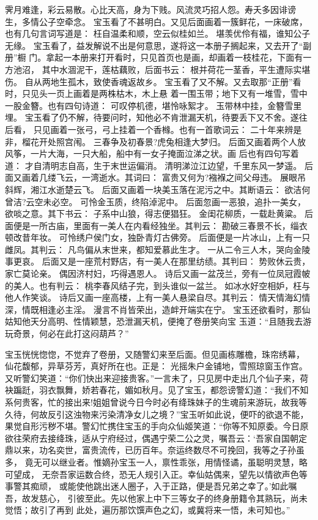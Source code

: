 霁月难逢，彩云易散。心比天高，身为下贱。风流灵巧招人怨。寿夭多因诽谤
生，多情公子空牵念。
宝玉看了不甚明白。又见后面画着一簇鲜花，一床破席，也有几句言词写道是：
枉自温柔和顺，空云似桂如兰。
堪羡优伶有福，谁知公子无缘。
宝玉看了，益发解说不出是何意思，遂将这一本册子搁起来，又去开了“副册”橱
门。拿起一本册来打开看时，只见首页也是画，却画着一枝桂花，下面有一方池沼，
其中水涸泥干，莲枯藕败，后面书云：
根并荷花一茎香，平生遭际实堪伤。
自从两地生孤木，致使香魂返故乡。
宝玉看了又不解。又去取那“正册”看时，只见头一页上画着是两株枯木，木上悬
着一围玉带；地下又有一堆雪，雪中一股金簪。也有四句诗道：
可叹停机德，堪怜咏絮才。
玉带林中挂，金簪雪里埋。
宝玉看了仍不解，待要问时，知他必不肯泄漏天机，待要丢下又不舍。遂往后看，
只见画着一张弓，弓上挂着一个香橼。也有一首歌词云：
二十年来辨是非，榴花开处照宫闱。
三春争及初春景?虎兔相逢大梦归。
后面又画着两个人放风筝，一片大海，一只大船，船中有一女子掩面泣涕之状。画
后也有四句写着道：
才自清明志自高，生于末世运偏消。
清明涕泣江边望，千里东风一梦遥。
后面又画着几缕飞云，一湾逝水。其词曰：
富贵又何为?襁褓之间父母违。
展眼吊斜辉，湘江水逝楚云飞。
后面又画着一块美玉落在泥污之中。其断语云：
欲洁何曾洁?云空未必空。
可怜金玉质，终陷淖泥中。
后面忽画一恶狼，追扑一美女，欲啖之意。其下书云：
子系中山狼，得志便猖狂。
金闺花柳质，一载赴黄粱。
后面便是一所古庙，里面有一美人在内看经独坐。其判云：
勘破三春景不长，缁衣顿改昔年妆。
可怜绣户侯门女，独卧青灯古佛旁。
后面便是一片冰山，上有一只雌凤。其判云：
凡鸟偏从末世来，都知爱慕此生才。
一从二令三人木，哭向金陵事更哀。
后面又是一座荒村野店，有一美人在那里纺绩。其判曰：
势败休云贵，家亡莫论亲。
偶因济村妇，巧得遇恩人。
诗后又画一盆茂兰，旁有一位凤冠霞帔的美人。也有判云：
桃李春风结子完，到头谁似一盆兰。
如冰水好空相妒，枉与他人作笑谈。
诗后又画一座高楼，上有一美人悬梁自尽。其判云：
情天情海幻情深，情既相逢必主淫。
漫言不肖皆荣出，造衅开端实在宁。
宝玉还欲看时，那仙姑知他天分高明、性情颖慧，恐泄漏天机，便掩了卷册笑向宝
玉道：“且随我去游玩奇景，何必在此打这闷葫芦？”

宝玉恍恍惚惚，不觉弃了卷册，又随警幻来至后面。但见画栋雕檐，珠帘绣幕，
仙花馥郁，异草芬芳，真好所在也。正是：
光摇朱户金铺地，雪照琼窗玉作宫。
又听警幻笑道：“你们快出来迎接贵客。”一言未了，只见房中走出几个仙子来，荷
袂蹁跹，羽衣飘舞，娇若春花，媚如秋月。见了宝玉，都怨谤警幻道：“我们不知
系何贵客，忙的接出来!姐姐曾说今日今时必有绛珠妹子的生魂前来游玩，故我等
久待，何故反引这浊物来污染清净女儿之境？”宝玉听如此说，便吓的欲退不能，
果觉自形污秽不堪。警幻忙携住宝玉的手向众仙姬笑道：“你等不知原委。今日原
欲往荣府去接绛珠，适从宁府经过，偶遇宁荣二公之灵，嘱吾云：‘吾家自国朝定
鼎以来，功名奕世，富贵流传，已历百年。奈运终数尽不可挽回，我等之子孙虽多，
竟无可以继业者。惟嫡孙宝玉一人，禀性乖张，用情怪谲，虽聪明灵慧，略可望成，
无奈吾家运数合终，恐无人规引入正。幸仙姑偶来，望先以情欲声色等事警其痴顽，
或能使他跳出迷人圈子，入于正路，便是吾兄弟之幸了。’如此嘱吾，故发慈心，
引彼至此。先以他家上中下三等女子的终身册籍令其熟玩，尚未觉悟；故引了再到
此处，遍历那饮馔声色之幻，或冀将来一悟，未可知也。”

